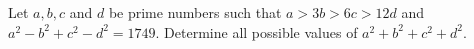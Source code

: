 Let $a,b,c$ and $d$ be prime numbers such that $a>3b>6c>12d$ and $a^2-b^2+c^2-d^2=1749$. Determine all possible values of $a^2+b^2+c^2+d^2$.
